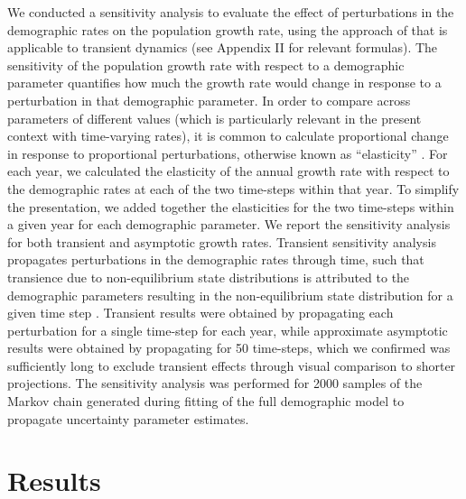 \documentclass[11pt]{article}
\begin{document}
We conducted a sensitivity analysis
to evaluate the effect of perturbations 
in the demographic rates on the population growth rate, 
using the approach of \cite{caswell2007sensitivity} 
that is applicable to transient dynamics
(see Appendix II for relevant formulas). 
The sensitivity of the population growth rate with respect to a demographic parameter
quantifies how much the growth rate would change in response to a perturbation in that 
demographic parameter. 
In order to compare across parameters of different values 
(which is particularly relevant in the present context with time-varying rates),
it is common to calculate proportional change in  
response to proportional perturbations,
otherwise known as ``elasticity''  \citep{caswell2001matrix}.
For each year, we calculated the elasticity of the annual growth rate with respect
to the demographic rates at each of the two time-steps within that year.
To simplify the presentation, 
we added together the  elasticities for the two time-steps within a given year 
for each demographic parameter.
We report the sensitivity analysis for both transient and asymptotic growth rates.
Transient sensitivity analysis propagates perturbations in the demographic rates 
through time, 
such that transience due to non-equilibrium state distributions is attributed to the
demographic parameters resulting in the non-equilibrium state distribution 
for a given time step \citep{caswell2007sensitivity}.
Transient results were obtained by propagating each perturbation for
a single time-step for each year,
while approximate asymptotic results were obtained by propagating for 50 time-steps,
which we confirmed was sufficiently long to exclude transient effects 
through visual comparison to shorter projections.
The sensitivity analysis was performed for 2000 samples of the Markov chain generated 
during fitting of the full demographic model to propagate uncertainty parameter estimates.






\section*{Results}
\end{document}
